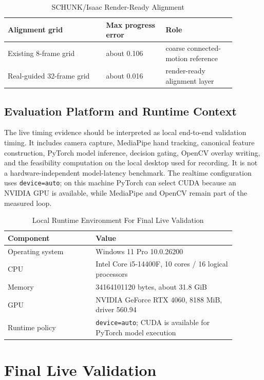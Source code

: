 \documentclass[conference]{IEEEtran}
\begin{document}
\begin{table}[t]
\caption{SCHUNK/Isaac Render-Ready Alignment}
\label{tab:alignment}
\centering
\scriptsize
\begin{tabular}{p{0.38\linewidth}p{0.23\linewidth}p{0.27\linewidth}}
\hline
Alignment grid & Max progress error & Role \\
\hline
Existing 8-frame grid & about 0.106 & coarse connected-motion reference \\
Real-guided 32-frame grid & about 0.016 & render-ready alignment layer \\
\hline
\end{tabular}
\end{table}

\subsection{Evaluation Platform and Runtime Context}

The live timing evidence should be interpreted as local end-to-end validation timing. It includes camera capture, MediaPipe hand tracking, canonical feature construction, PyTorch model inference, decision gating, OpenCV overlay writing, and the feasibility computation on the local desktop used for recording. It is not a hardware-independent model-latency benchmark. The realtime configuration uses \texttt{device=auto}; on this machine PyTorch can select CUDA because an NVIDIA GPU is available, while MediaPipe and OpenCV remain part of the measured loop.

\begin{table}[t]
\caption{Local Runtime Environment For Final Live Validation}
\label{tab:runtime}
\centering
\scriptsize
\begin{tabular}{p{0.34\linewidth}p{0.54\linewidth}}
\hline
Component & Value \\
\hline
Operating system & Windows 11 Pro 10.0.26200 \\
CPU & Intel Core i5-14400F, 10 cores / 16 logical processors \\
Memory & 34164101120 bytes, about 31.8 GiB \\
GPU & NVIDIA GeForce RTX 4060, 8188 MiB, driver 560.94 \\
Runtime policy & \texttt{device=auto}; CUDA is available for PyTorch model execution \\
\hline
\end{tabular}
\end{table}

\section{Final Live Validation}
\end{document}
